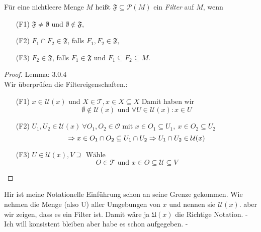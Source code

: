 {
   Für eine nichtleere Menge $M$ heißt $\mathfrak{F} \subseteq \mathcal{P}(M)$ 
   ein \emph{Filter} auf $M$, wenn
\begin{enumerate}
  \item[(F1)] $\mathfrak{F} \neq \emptyset$ und $\emptyset \notin \mathfrak{F},$
  \item[(F2)] $F_1 \cap F_2 \in \mathfrak{F}$, falls $F_1, F_2 \in \mathfrak{F},$
  \item[(F3)] $F_2 \in \mathfrak{F}$, falls $F_1 \in \mathfrak{F}$
   und $F_1 \subseteq F_2 \subseteq M.$
\end{enumerate} 
}

\begin{proof}{Lemma: 3.0.4}\\
Wir überprüfen die Filtereigenschaften.:
    
    \begin{itemize}
    \item[(F1)]$x \in \mathscr{U}(x)$ und $X \in \mathcal{T}, x \in X \subseteq X$ 
    Damit haben wir
          $$
          \emptyset \notin \mathscr{U}(x) \text{ und } 
          \forall U \in \mathscr{U}(x): x \in U
          $$
    \item[(F2)] $U_1, U_2 \in \mathcal{U}(x) \ \forall O_1, O_2 \in \mathcal{O} 
    \text{ mit } x \in O_1 \subseteq U_1, \ x \in O_2 \subseteq U_2$ \\
          $$
          \Rightarrow x \in O_1 \cap O_2 \subseteq U_1 \cap U_2 \\
          \Rightarrow U_1 \cap U_2 \in \mathcal{U}(x)
          $$
    \item[(F3)] $U \in \mathscr{U}(x), V \supseteq$ Wähle 
        $$
        O \in \mathcal{T} \text{ und } x \in O \subseteq \mathscr{U} \subseteq V
        $$
    \end{itemize}
    
\end{proof}

Hir ist meine Notationelle Einführung schon an seine Grenze gekommen. 
Wie nehmen die Menge (also U) aller Umgebungen von $x$ und nennen sie $\mathscr{U}(x)$.
aber wir zeigen, dass es ein Filter ist. Damit wäre ja $\mathfrak{U}(x)$ 
die Richtige Notation.
- Ich will konsistent bleiben aber habe es schon aufgegeben. -

